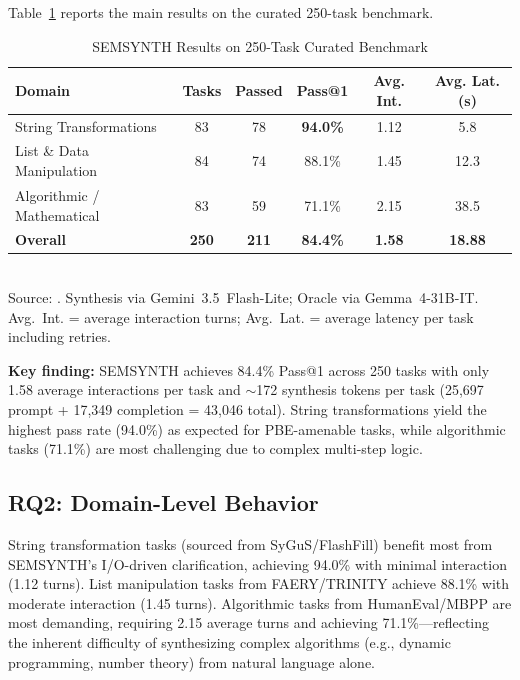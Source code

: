 \documentclass[10pt,conference]{IEEEtran}
\begin{document}
Table~\ref{tab:main-results} reports the main results on the curated 250-task benchmark.

\begin{table}[htbp]
\centering
\caption{SEMSYNTH Results on 250-Task Curated Benchmark}
\label{tab:main-results}
\footnotesize
\setlength{\tabcolsep}{4pt}
\begin{tabular}{lccccc}
\toprule
\textbf{Domain} & \textbf{Tasks} & \textbf{Passed} & \textbf{Pass@1} & \textbf{Avg. Int.} & \textbf{Avg. Lat. (s)} \\
\midrule
String Transformations & 83 & 78 & \textbf{94.0\%} & 1.12 & 5.8 \\
List \& Data Manipulation & 84 & 74 & 88.1\% & 1.45 & 12.3 \\
Algorithmic / Mathematical & 83 & 59 & 71.1\% & 2.15 & 38.5 \\
\midrule
\textbf{Overall} & \textbf{250} & \textbf{211} & \textbf{84.4\%} & \textbf{1.58} & \textbf{18.88} \\
\bottomrule
\end{tabular}
\\
{\footnotesize Source: . Synthesis via Gemini~3.5~Flash-Lite; Oracle via Gemma~4-31B-IT. Avg.~Int. = average interaction turns; Avg.~Lat. = average latency per task including retries.}
\end{table}

\textbf{Key finding:} SEMSYNTH achieves 84.4\% Pass@1 across 250 tasks with only 1.58 average interactions per task and $\sim$172 synthesis tokens per task (25,697 prompt + 17,349 completion = 43,046 total). String transformations yield the highest pass rate (94.0\%) as expected for PBE-amenable tasks, while algorithmic tasks (71.1\%) are most challenging due to complex multi-step logic.

\subsection{RQ2: Domain-Level Behavior}
String transformation tasks (sourced from SyGuS/FlashFill) benefit most from SEMSYNTH's I/O-driven clarification, achieving 94.0\% with minimal interaction (1.12 turns). List manipulation tasks from FAERY/TRINITY achieve 88.1\% with moderate interaction (1.45 turns). Algorithmic tasks from HumanEval/MBPP are most demanding, requiring 2.15 average turns and achieving 71.1\%---reflecting the inherent difficulty of synthesizing complex algorithms (e.g., dynamic programming, number theory) from natural language alone.
\end{document}
